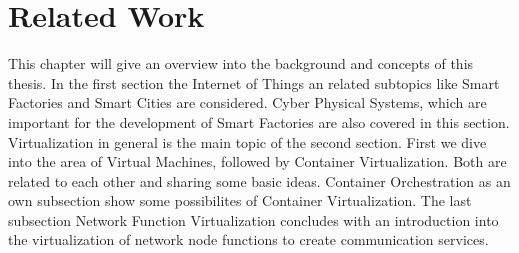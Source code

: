 \chapter{Related Work}
This chapter will give an overview into the background and concepts of this thesis.
In the first section the Internet of Things an related subtopics like Smart Factories and Smart Cities are considered.
Cyber Physical Systems, which are important for the development of Smart Factories are also covered in this section.
Virtualization in general is the main topic of the second section.
First we dive into the area of Virtual Machines, followed by Container Virtualization.
Both are related to each other and sharing some basic ideas.
Container Orchestration as an own subsection show some possibilites of Container Virtualization.
The last subsection Network Function Virtualization concludes with an introduction into the virtualization of network node functions to create communication services.


